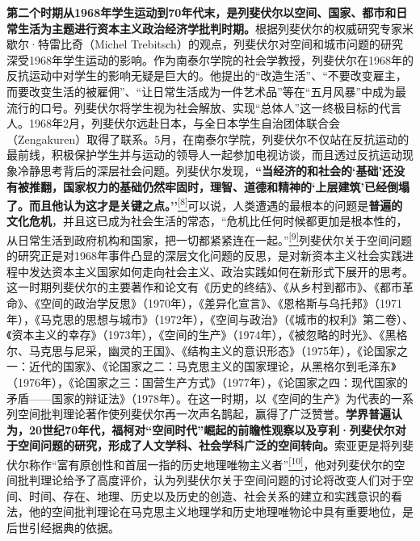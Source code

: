 \documentclass[UTF8, fontset = sourcesans, a4paper, oneside, zihao =
-4, scheme=chinese, no-math, space=true]{ctexbook}
\begin{document}
\textbf{第二个时期从1968年学生运动到70年代末，是列斐伏尔以空间、国家、都市和日常生活为主题进行资本主义政治经济学批判时期。}根据列斐伏尔的权威研究专家米歇尔·特雷比奇（Michel
Trebitsch）的观点，列斐伏尔对空间和城市问题的研究深受1968年学生运动的影响。作为南泰尔学院的社会学教授，列斐伏尔在1968年的反抗运动中对学生的影响无疑是巨大的。他提出的``改造生活''、``不要改变雇主，而要改变生活的被雇佣''、``让日常生活成为一件艺术品''等在``五月风暴''中成为最流行的口号。列斐伏尔将学生视为社会解放、实现``总体人''这一终极目标的代言人。1968年2月，列斐伏尔远赴日本，与全日本学生自治团体联合会（Zengakuren）取得了联系。5月，在南泰尔学院，列斐伏尔不仅站在反抗运动的最前线，积极保护学生并与运动的领导人一起参加电视访谈，而且透过反抗运动现象冷静思考背后的深层社会问题。列斐伏尔发现，\textbf{``当经济的和社会的`基础'还没有被推翻，国家权力的基础仍然牢固时，理智、道德和精神的`上层建筑'已经倒塌了。而且他认为这才是关键之点。''}\protect\hypertarget{part0004.htmlux5cux23w8}{}{}\protect\hyperlink{part0004.htmlux5cux23m8}{\textsuperscript{{[}8{]}}}可以说，人类遭遇的最根本的问题是\textbf{普遍的文化危机}，并且这已成为社会生活的常态，``危机比任何时候都更加是根本性的，从日常生活到政府机构和国家，把一切都紧紧连在一起。''\protect\hypertarget{part0004.htmlux5cux23w9}{}{}\protect\hyperlink{part0004.htmlux5cux23m9}{\textsuperscript{{[}9{]}}}列斐伏尔关于空间问题的研究正是对1968年事件凸显的深层文化问题的反思，是对新资本主义社会实践进程中发达资本主义国家如何走向社会主义、政治实践如何在新形式下展开的思考。这一时期列斐伏尔的主要著作和论文有《历史的终结》、《从乡村到都市》、《都市革命》、《空间的政治学反思》（1970年），《差异化宣言》、《恩格斯与乌托邦》（1971年），《马克思的思想与城市》（1972年），《空间与政治》（《城市的权利》第二卷）、《资本主义的幸存》（1973年），《空间的生产》（1974年），《被忽略的时光》、《黑格尔、马克思与尼采，幽灵的王国》、《结构主义的意识形态》（1975年），《论国家之一：近代的国家》、《论国家之二：马克思主义的国家理论，从黑格尔到毛泽东》（1976年），《论国家之三：国营生产方式》（1977年），《论国家之四：现代国家的矛盾------国家的辩证法》（1978年）。在这一时期，以《空间的生产》为代表的一系列空间批判理论著作使列斐伏尔再一次声名鹊起，赢得了广泛赞誉。\textbf{学界普遍认为，20世纪70年代，福柯对``空间时代''崛起的前瞻性观察以及亨利·列斐伏尔对于空间问题的研究，形成了人文学科、社会学科广泛的空间转向。}索亚更是将列斐伏尔称作``富有原创性和首屈一指的历史地理唯物主义者''\protect\hypertarget{part0004.htmlux5cux23w10}{}{}\protect\hyperlink{part0004.htmlux5cux23m10}{\textsuperscript{{[}10{]}}}，他对列斐伏尔的空间批判理论给予了高度评价，认为列斐伏尔关于空间问题的讨论将改变人们对于空间、时间、存在、地理、历史以及历史的创造、社会关系的建立和实践意识的看法，他的空间批判理论在马克思主义地理学和历史地理唯物论中具有重要地位，是后世引经据典的依据。
\end{document}
